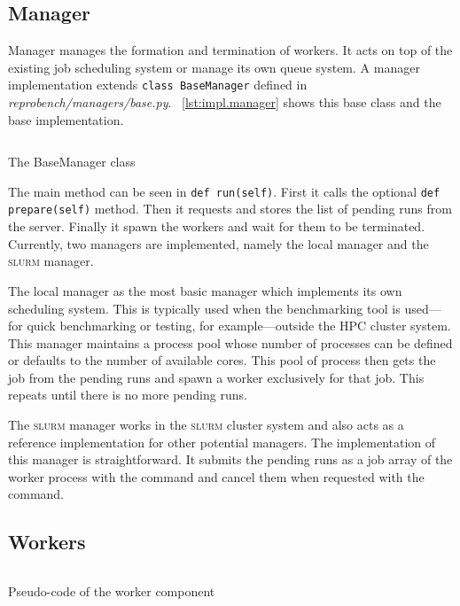 \subsection{Manager}

Manager manages the formation and termination of workers.
It acts on top of the existing job scheduling system or manage its own queue system.
A manager implementation extends \texttt{class BaseManager} defined in \emph{reprobench/managers/base.py}.
\lst~\ref{lst:impl.manager} shows this base class and the base implementation.

\begin{listing}
    \inputminted[firstline=7,lastline=34]{python}{assets/listings/reprobench/reprobench/managers/base.py}
    \caption{The BaseManager class}
    \label{lst:impl.manager}
\end{listing}

The main method can be seen in \texttt{def run(self)}.
First it calls the optional \texttt{def prepare(self)} method.
Then it requests and stores the list of pending runs from the server.
Finally it spawn the workers and wait for them to be terminated.
Currently, two managers are implemented, namely the local manager and the \textsc{slurm} manager.

The local manager as the most basic manager which implements its own scheduling system.
This is typically used when the benchmarking tool is used---for quick benchmarking or testing, for example---outside the HPC cluster system.
This manager maintains a process pool whose number of processes can be defined or defaults to the number of available cores.
This pool of process then gets the job from the pending runs and spawn a worker exclusively for that job.
This repeats until there is no more pending runs.

The \textsc{slurm} manager works in the \textsc{slurm} cluster system and also acts as a reference implementation for other potential managers.
The implementation of this manager is straightforward.
It submits the pending runs as a job array of the worker process with the  command and cancel them when requested with the  command.

\subsection{Workers}

\begin{listing}
    \inputminted{python}{assets/listings/pseudocodes/worker.py}
    \caption{Pseudo-code of the worker component}
    \label{lst:impl.worker}
\end{listing}

